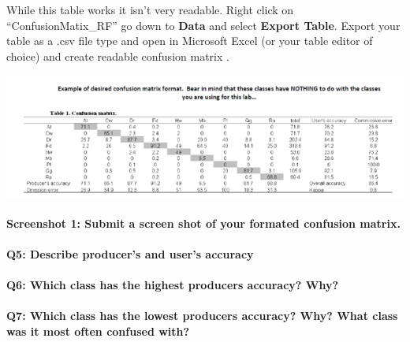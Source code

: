 \documentclass[
]{book}
\begin{document}
While this table works it isn't very readable. Right click on ``ConfusionMatix\_RF'' go down to \textbf{Data} and select \textbf{Export Table}. Export your table as a .csv file type and open in Microsoft Excel (or your table editor of choice) and create readable confusion matrix .

\begin{center}\includegraphics[width=0.8\linewidth]{images/08-desired-confusion-matrix} \end{center}

\hypertarget{screenshot-1-submit-a-screen-shot-of-your-formated-confusion-matrix.}{%
\paragraph*{Screenshot 1: Submit a screen shot of your formated confusion matrix.}\label{screenshot-1-submit-a-screen-shot-of-your-formated-confusion-matrix.}}

\hypertarget{q5-describe-producers-and-users-accuracy}{%
\paragraph*{Q5: Describe producer's and user's accuracy}\label{q5-describe-producers-and-users-accuracy}}

\hypertarget{q6-which-class-has-the-highest-producers-accuracy-why}{%
\paragraph*{Q6: Which class has the highest producers accuracy? Why?}\label{q6-which-class-has-the-highest-producers-accuracy-why}}

\hypertarget{q7-which-class-has-the-lowest-producers-accuracy-why-what-class-was-it-most-often-confused-with}{%
\paragraph*{Q7: Which class has the lowest producers accuracy? Why? What class was it most often confused with?}\label{q7-which-class-has-the-lowest-producers-accuracy-why-what-class-was-it-most-often-confused-with}}
\end{document}
